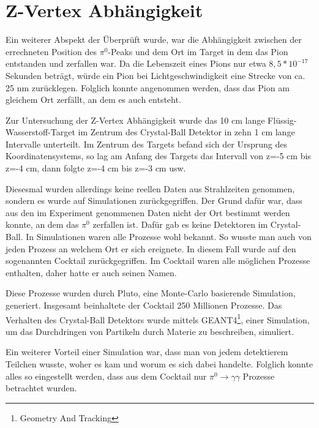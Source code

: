 \documentclass[a4paper,11pt,oneside,final,german,openbib,pdftex]{scrbook}
\begin{document}
\section{Z-Vertex Abh\"angigkeit}
\label{sec:Z-Vertex-Abaengigkeit}
Ein weiterer Abspekt der \"Uberpr\"uft wurde, war die Abh\"angigkeit zwischen der errechneten  Position des $\pi^0$-Peaks und dem Ort im Target in dem das Pion entstanden und zerfallen war. Da die Lebenszeit eines Pions nur etwa $8,5*10^{-17}$ Sekunden betr\"agt, w\"urde ein Pion bei Lichtgeschwindigkeit eine Strecke von ca. 25 nm zur\"ucklegen. Folglich konnte angenommen werden, dass das Pion am gleichem Ort zerf\"allt, an dem es auch entsteht.

 
Zur Untersuchung der Z-Vertex Abhängigkeit wurde das 10 cm lange Fl\"ussig-Wasserstoff-Target im Zentrum des Crystal-Ball Detektor in zehn 1 cm lange Intervalle unterteilt. Im Zentrum des Targets befand sich der Ursprung des Koordinatensystems, so lag am Anfang des Targets das Intervall von z=-5 cm bis z=-4 cm, dann folgte z=-4 cm bis z=-3 cm usw. 

Diesesmal wurden allerdings keine reellen Daten aus Strahlzeiten genommen, sondern es wurde auf Simulationen zur\"uckgegriffen. Der Grund daf\"ur war, dass aus den im Experiment genommenen Daten nicht der Ort bestimmt werden konnte, an dem das $\pi^0$ zerfallen ist. Daf\"ur gab es keine Detektoren im Crystal-Ball. In Simulationen waren alle Prozesse wohl bekannt. So wusste man auch von jeden Prozess an welchem Ort er sich ereignete. In diesem Fall wurde auf den sogenannten Cocktail zur\"uckgegriffen. Im Cocktail waren alle m\"oglichen Prozesse enthalten, daher hatte er auch seinen Namen. 

Diese Prozesse wurden durch Pluto, eine Monte-Carlo basierende Simulation, generiert. Insgesamt beinhaltete der Cocktail 250 Millionen Prozesse. Das Verhalten des Crystal-Ball Detektors wurde mittels GEANT4\footnote{Geometry And Tracking}, einer Simulation, um das Durchdringen von Partikeln durch Materie zu beschreiben, simuliert.

Ein weiterer Vorteil einer Simulation war, dass man von jedem detektierem Teilchen wusste, woher es kam und worum es sich dabei handelte. Folglich konnte alles so eingestellt werden, dass aus dem Cocktail nur $\pi^0 \rightarrow \gamma \gamma$ Prozesse betrachtet wurden.
\end{document}
